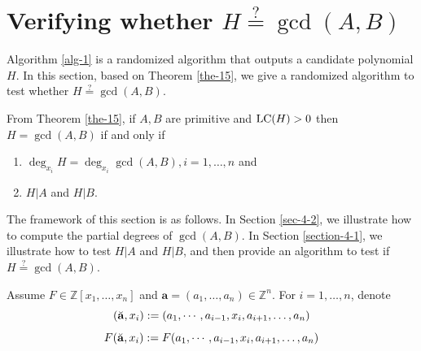 \documentclass[final,20pt]{elsarticle}
\def\Z{{\mathbb Z}}
\def\LC{\hbox{\rm{LC}}}
\begin{document}
\section{Verifying whether $H\overset{\text{?}}=\gcd(A,B)$}
Algorithm \ref{alg-1} is a randomized algorithm that outputs a candidate polynomial $H$. In this section, based on Theorem \ref{the-15}, we give a randomized algorithm to test whether $H\overset{\text{?}}=\gcd(A,B)$.

From Theorem \ref{the-15}, if $A,B$ are primitive and $\LC(H)>0$ then $H=\gcd(A,B)$ if and only if \begin{enumerate}
\item $\deg_{x_i}H=\deg_{x_i}\gcd(A,B),i=1,\dots,n$ and
\item $H|A$ and $H|B$.
\end{enumerate}

The framework of this section is as follows. In Section \ref{sec-4-2}, we illustrate how to compute the partial degrees of $\gcd(A,B)$.
%
In Section \ref{section-4-1}, we illustrate how to test $H|A$ and $H|B$, and then provide an algorithm to test if $H\overset{\text{?}}=\gcd(A,B)$.


Assume $F\in \Z[x_1,\dots,x_n]$ and $\mathbf{a}=(a_1,\dots,a_{n})\in\Z^n$. For $i=1,\dots,n$, denote
$$(\Breve{\mathbf{a}},x_i):=(a_1,\cdots,a_{i-1}, x_{i},a_{i+1},\dots,a_{n})$$
%
$$F(\Breve{\mathbf{a}},x_i):=F(a_1,\cdots,a_{i-1}, x_{i},a_{i+1},\dots,a_{n})$$
\end{document}
